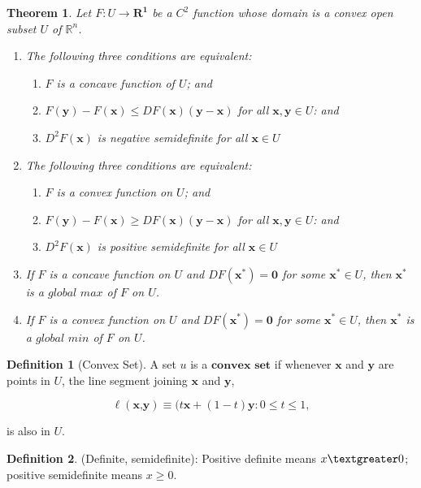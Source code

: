 \documentclass{article}
\newtheorem{theorem}{Theorem}
\theoremstyle{definition}
\newtheorem{definition}{Definition}
\theoremstyle{Solution}
\begin{document}
\begin{theorem} 
Let $F: U \mathbf{ \rightarrow R^1}$ be a $C^2$ function whose domain is a convex open subset $U$ of $\mathbb{R}^n$.
\begin{enumerate}
	\item The following three conditions are equivalent:
	\begin{enumerate}
		\item $F$ is a concave function of $U$; and
		\item $F(\textbf{y})-F(\textbf{x}) \leq DF(\textbf{x})(\textbf{y}-\textbf{x})$ for all $\textbf{x},  \textbf{y} \in U$: and
		\item $D^2F(\textbf{x})$ is negative semidefinite for all $\textbf{x} \in U$
	\end{enumerate}
	\item The following three conditions are equivalent:
	\begin{enumerate}
		\item $F$ is a convex function on $U$; and 
		\item $F(\textbf{y})-F(\textbf{x}) \geq DF(\textbf{x})(\textbf{y}-\textbf{x})$ for all $\textbf{x},  \textbf{y} \in U$: and
		\item $D^2F(\textbf{x})$ is positive semidefinite for all $\textbf{x} \in U$
	\end{enumerate}
	\item If $F$ is a concave function on $U$ and $DF(\textbf{x}^*)=\mathbf{0}$ for some $\textbf{x}^* \in U$, then $\textbf{x}^*$ is a $\textit{global max}$ of $F$ on $U$.
	\item If $F$ is a convex function on $U$ and $DF(\textbf{x}^*)=\mathbf{0}$ for some $\textbf{x}^* \in U$, then $\textbf{x}^*$ is a $\textit{global min}$ of $F$ on $U$.
\end{enumerate}
\end{theorem}

\begin{definition}[Convex Set]
A set $u$ is a $\textbf{convex set}$ if whenever $\textbf{x}$ and $\textbf{y}$ are points in $U$, the line segment joining $\textbf{x}$ and $\textbf{y}$,

\begin{equation}
	\ell(\textbf{x,y}) \equiv {(t\textbf{x}+(1-t)\textbf{y}:0 \leq t \leq 1},
\end{equation}

is also in $U$. 
\end{definition}

\begin{definition}
(Definite, semidefinite): Positive definite means $x \textgreater 0$; positive semidefinite means $x \geq 0$.
\end{definition}
\end{document}
